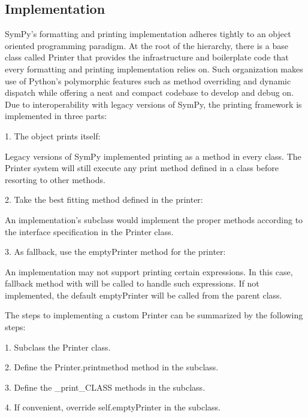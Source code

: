 \documentclass[11pt]{article}
\begin{document}
\subsection{Implementation}
SymPy’s formatting and printing implementation adheres tightly to an object oriented programming paradigm. At the root of the hierarchy, there is a base class called Printer that provides the infrastructure and boilerplate code that every formatting and printing implementation relies on. Such organization makes use of Python’s polymorphic features such as method overriding and dynamic dispatch while offering a neat and compact codebase to develop and debug on. Due to interoperability with legacy versions of SymPy, the printing framework is implemented in three parts:

1. The object prints itself:

Legacy versions of SymPy implemented printing as a method in every class. The Printer system will still execute any print method defined in a class before resorting to other methods.

2. Take the best fitting method defined in the printer:

An implementation’s subclass would implement the proper methods according to the interface specification in the Printer class.

3. As fallback, use the emptyPrinter method for the printer:

An implementation may not support printing certain expressions. In this case, fallback method with will be called to handle such expressions. If not implemented, the default emptyPrinter will be called from the parent class.

The steps to implementing a custom Printer can be summarized by the following steps:

1. Subclass the Printer class.

2. Define the Printer.printmethod method in the subclass.

3. Define the \_print\_CLASS methods in the subclass.

4. If convenient, override self.emptyPrinter in the subclass.
\end{document}
